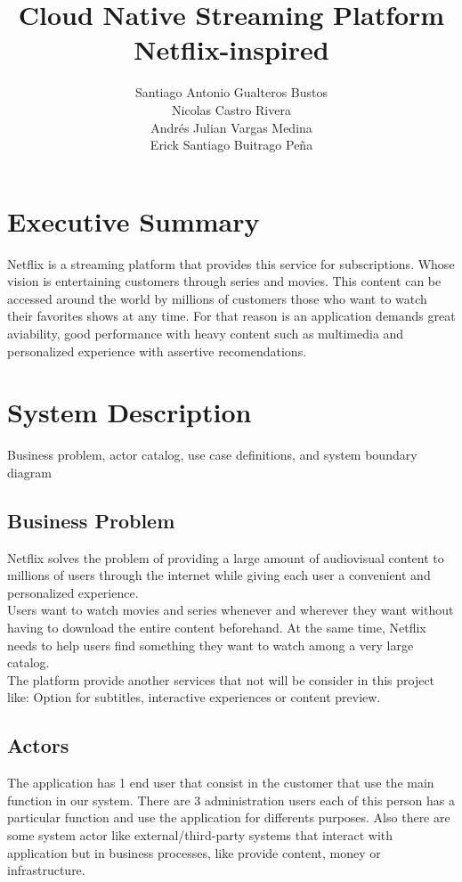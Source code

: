 \documentclass{article}
\title{Cloud Native Streaming Platform Netflix-inspired}
\author{ Santiago Antonio Gualteros Bustos \\ Nicolas Castro Rivera \\ Andrés Julian Vargas Medina \\ Erick Santiago Buitrago Peña   }
\date{}
\begin{document}
\maketitle

\section{Executive Summary}
Netflix is a streaming platform that provides this service for subscriptions. Whose vision is entertaining customers through series and movies.
This content can be accessed around the world by millions of customers those who want to watch their favorites shows at any time.
For that reason is an application demands great aviability, good performance with heavy content such as multimedia and personalized experience with assertive recomendations.

\section{System Description}
Business problem, actor catalog, use case definitions, and
system boundary diagram



\subsection{Business Problem}
Netflix solves the problem of providing a large amount of audiovisual content to millions of users 
through the internet while giving each user a convenient and personalized experience.
\\Users want to watch movies and series whenever and wherever they want without having to download the entire content beforehand. 
At the same time, Netflix needs to help users find something they want to watch among a very large catalog.
\\The platform provide another services that not will be consider in this project like: Option for subtitles, interactive experiences or content preview.
 

\subsection{Actors}
The application has 1 end user that consist in the customer that use the main function in our system.
There are 3 administration users each of this person has a particular function and use the application for differents purposes. 
Also there are some system actor like external/third-party systems that interact with application but in business processes, like provide content, money or infrastructure. 
\end{document}
